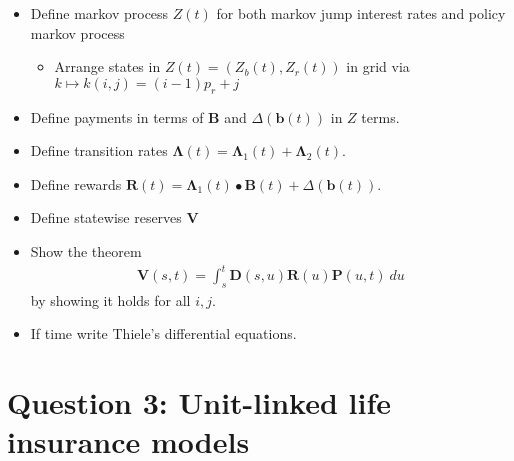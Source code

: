 \documentclass[a4paper,12pt,openany]{book}
\providecommand{\tightlist}{%
 \setlength{\itemsep}{0pt}\setlength{\parskip}{0pt}}
\begin{document}
\begin{itemize}
\tightlist
\item
  Define markov process \(Z(t)\) for both markov jump interest rates and policy markov process

  \begin{itemize}
  \tightlist
  \item
    Arrange states in \(Z(t)=(Z_b(t),Z_r(t))\) in grid via \(k\mapsto k(i,j) = (i-1)p_r+j\)
  \end{itemize}
\item
  Define payments in terms of \(\mathbf B\) and \(\Delta (\mathbf b(t))\) in \(Z\) terms.
\item
  Define transition rates \(\mathbf \Lambda(t)=\mathbf \Lambda_1(t)+\mathbf \Lambda_2(t)\).
\item
  Define rewards \(\mathbf R(t)=\mathbf \Lambda_1(t)\bullet \mathbf B(t)+\Delta(\mathbf b(t))\).
\item
  Define statewise reserves \(\mathbf V\)
\item
  Show the theorem
  \begin{align*}
    \mathbf V(s,t)=\int_s^t \mathbf D(s,u)\mathbf R(u)\mathbf P(u,t)\ du
    \end{align*}
  by showing it holds for all \(i,j\).
\item
  If time write Thiele's differential equations.
\end{itemize}

\newpage

\hypertarget{question-3-unit-linked-life-insurance-models}{%
\section{Question 3: Unit-linked life insurance models}\label{question-3-unit-linked-life-insurance-models}}
\end{document}
